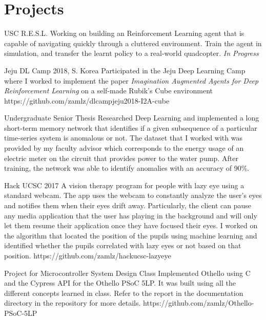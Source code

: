 \documentclass{cv}
\begin{document}
\section{Projects}
\begin{adjustwidth}{0.5cm}{0.5cm}

{USC R.E.S.L.}
{Working on building an Reinforcement Learning agent that is capable of
navigating quickly through a cluttered environment. Train the agent in
simulation, and transfer the learnt policy to a real-world quadcopter.
\textit{In Progress}}{}

{Jeju DL Camp 2018, S. Korea}
{Participated in the Jeju Deep Learning Camp where I worked to
implement the paper \textit{Imagination Augmented Agents for
Deep Reinforcement Learning} on a self-made Rubik's Cube environment}
{https://github.com/zamlz/dlcampjeju2018-I2A-cube}

{Undergraduate Senior Thesis}
{Researched Deep Learning and implemented a long short-term memory
network that identifies if a given subsequence of a particular
time-series system is anomalous or not. The dataset that I worked with
was provided by my faculty advisor which corresponds to the energy usage
of an electric meter on the circuit that provides power to the water
pump. After training, the network was able to identify anomalies with
an accuracy of 90\%.}{}

{Hack UCSC 2017}
{A vision therapy program for people with lazy eye using a standard
webcam. The app uses the webcam to constantly analyze the user's eyes
and notifies them when their eyes drift away. Particularly, the client
can pause any media application that the user has playing in the
background and will only let them resume their application once they
have focused their eyes. I worked on the algorithm that located the
position of the pupils using machine learning and identified whether
the pupils correlated with lazy eyes or not based on that position.}
{https://github.com/zamlz/hackucsc-lazyeye}

{Project for Microcontroller System Design Class}
{Implemented Othello using C and the Cypress API for the Othello PSoC 5LP.
It was built using all the different concepts learned in class. Refer to the
report in the documentation directory in the repository for more details.}
{https://github.com/zamlz/Othello-PSoC-5LP}


\end{adjustwidth}
\end{document}
